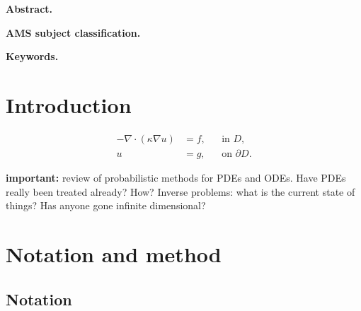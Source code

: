 \documentclass[10pt]{article}
\begin{document}
\maketitle	

\textbf{Abstract.}

\textbf{AMS subject classification.}

\textbf{Keywords.}

\section{Introduction}

\todo \cite{AbG20, KeH16, KSH18, CCC16, CGS17}

\begin{equation}\label{eq:ellipticEquation}
\begin{aligned}
	-\nabla \cdot (\kappa \nabla u) &= f, &&\text{in } D,\\
	u &= g, &&\text{on } \partial D.
\end{aligned}
\end{equation}

\textbf{important:} review of probabilistic methods for PDEs and ODEs. Have PDEs really been treated already? How? Inverse problems: what is the current state of things? Has anyone gone infinite dimensional?

\section{Notation and method}

\subsection{Notation}
\end{document}

